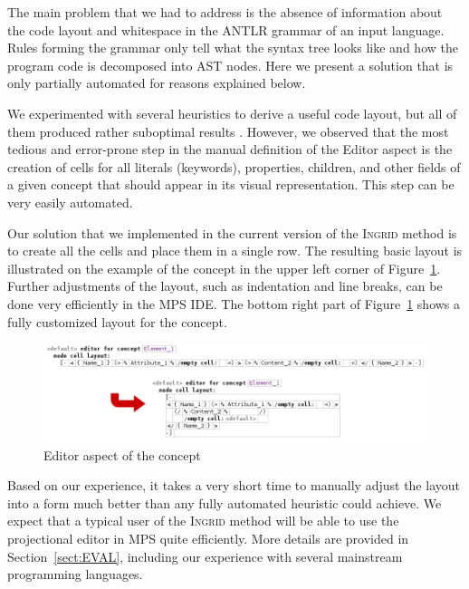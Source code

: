 The main problem that we had to address is the absence of information about the code layout and whitespace in the ANTLR grammar of an input language.
Rules forming the grammar only tell what the syntax tree looks like and how the program code is decomposed into AST nodes.
Here we present a solution that is only partially automated for reasons explained below.

We experimented with several heuristics to derive a useful code layout, but all of them produced rather suboptimal results .
However, we observed that the most tedious and error-prone step in the manual definition of the Editor aspect is the creation of cells for all literals (keywords), properties, children, and other fields of a given concept that should appear in its visual representation.
This step can be very easily automated.

Our solution that we implemented in the current version of the \textsc{Ingrid} method is to create all the cells and place them in a single row.
The resulting basic layout is illustrated on the example of the  concept in the upper left corner of Figure~\ref{fig:EDITORADJUST}.
Further adjustments of the layout, such as indentation and line breaks, can be done very efficiently  in the MPS IDE.
The bottom right part of Figure~\ref{fig:EDITORADJUST} shows a fully customized layout for the  concept.

\begin{figure}[ht]
	\centering
	\includegraphics[scale=0.55]{./images/editor_adjustment.png}
	\caption{Editor aspect of the  concept}
	\label{fig:EDITORADJUST}
\end{figure}

Based on our experience, it takes a very short time to manually adjust the layout into a form much better than any fully automated heuristic could achieve.
We expect that a typical user of the \textsc{Ingrid} method will be able to use the projectional editor in MPS quite efficiently.
More details are provided in Section~\ref{sect:EVAL}, including our experience with several mainstream programming languages.

